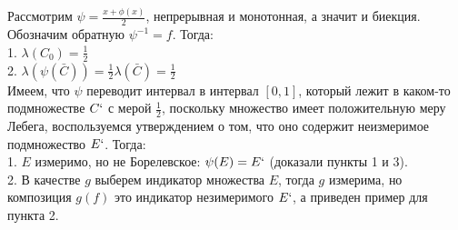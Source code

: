 \Proof Рассмотрим $\psi = \frac{x+\phi(x)}{2}$, непрерывная и монотонная, а значит и биекция. Обозначим обратную $\psi^{-1} = f$. Тогда: \\
1. $\lambda(C_0) = \frac{1}{2}$ \\
2. $\lambda(\psi(\bar{C})) = \frac{1}{2}\lambda(\bar{C}) = \frac{1}{2}$ \\
Имеем, что $\psi$ переводит интервал в интервал $[0,1]$, который лежит в каком-то подмножестве $C`$ с мерой $\frac{1}{2}$, поскольку множество имеет положительную меру Лебега, воспользуемся утверждением о том, что оно содержит неизмеримое подмножество $E`$. Тогда: \\
1. $E$ измеримо, но не Борелевское: $\psi(E) = E`$ (доказали пункты 1 и 3).\\
2. В качестве $g$ выберем индикатор множества $E$, тогда $g$ измерима, но композиция $g(f)$ это индикатор незимеримого $E`$, а приведен пример для пункта 2. \EndProof
